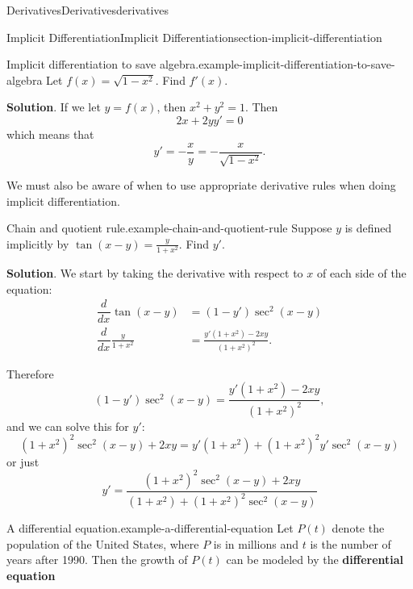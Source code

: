 \documentclass[oneside,10pt,]{book}
\newcommand{\terminology}[1]{\textbf{#1}}
\numberwithin{equation}{section}
\newcommand{\dv}[3][]{\dfrac{d^{#1} #2}{d #3^{#1}}}
\begin{document}
\begin{chapterptx}{Derivatives}{}{Derivatives}{}{}{derivatives}
\begin{sectionptx}{Implicit Differentiation}{}{Implicit Differentiation}{}{}{section-implicit-differentiation}
\begin{example}{Implicit differentiation to save algebra.}{example-implicit-differentiation-to-save-algebra}%
\hypertarget{p-161}{}%
Let \(f(x) = \sqrt{1-x^{2}}\). Find \(f'(x)\).%
\par\smallskip%
\noindent\textbf{Solution}.\hypertarget{solution-34}{}\quad%
\hypertarget{p-162}{}%
If we let \(y=f(x)\), then \(x^{2} + y^{2} = 1\). Then%
\begin{equation*}
2x + 2yy' = 0
\end{equation*}
which means that%
\begin{equation*}
y' = -\frac{x}{y} = -\frac{x}{\sqrt{1-x^{2}}}.
\end{equation*}
%
\end{example}
\hypertarget{p-163}{}%
We must also be aware of when to use appropriate derivative rules when doing implicit differentiation.%
\begin{example}{Chain and quotient rule.}{example-chain-and-quotient-rule}%
\hypertarget{p-164}{}%
Suppose \(y\) is defined implicitly by \(\tan(x-y) = \frac{y}{1+x^{2}}\). Find \(y'\).%
\par\smallskip%
\noindent\textbf{Solution}.\hypertarget{solution-35}{}\quad%
\hypertarget{p-165}{}%
We start by taking the derivative with respect to \(x\) of each side of the equation:%
\begin{align*}
\dv{}{x}\tan(x-y) & = (1-y')\sec^{2}(x-y) \\
\dv{}{x}\frac{y}{1+x^{2}} & = \frac{y'(1+x^{2}) - 2xy}{(1+x^{2})^{2}}. 
\end{align*}
%
\par
\hypertarget{p-166}{}%
Therefore%
\begin{equation*}
(1-y')\sec^{2}(x-y) = \frac{y'(1+x^{2}) - 2xy}{(1+x^{2})^{2}},
\end{equation*}
and we can solve this for \(y'\):%
\begin{equation*}
(1+x^{2})^{2}\sec^{2}(x-y) + 2xy = y'(1+x^{2}) + (1+x^{2})^{2}y'\sec^{2}(x-y)
\end{equation*}
or just%
\begin{equation*}
y' = \frac{(1+x^{2})^{2}\sec^{2}(x-y) + 2xy}{(1+x^{2})+(1+x^{2})^{2}\sec^{2}(x-y)}
\end{equation*}
%
\end{example}
\begin{example}{A differential equation.}{example-a-differential-equation}%
\hypertarget{p-167}{}%
Let \(P(t)\) denote the population of the United States, where \(P\) is in millions and \(t\) is the number of years after 1990. Then the growth of \(P(t)\) can be modeled by the \terminology{differential equation}%

\end{example}
\end{sectionptx}
\end{chapterptx}
\end{document}
